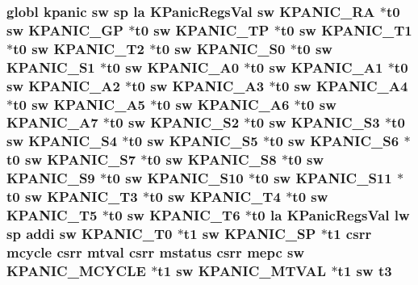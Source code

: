 \hypertarget{riscv_2kpanica_8S_aee57a95d2247b47bdd0ef4c3c0badccb}{
\subsubsection[{t3}]{\setlength{\rightskip}{0pt plus 5cm}globl {\bf kpanic} {\bf sw} {\bf sp} {\bf la} {\bf K\-Panic\-Regs\-Val} {\bf sw} {\bf K\-P\-A\-N\-I\-C\-\_\-\-R\-A} $\ast${\bf t0} {\bf sw} {\bf K\-P\-A\-N\-I\-C\-\_\-\-G\-P} $\ast${\bf t0} {\bf sw} {\bf K\-P\-A\-N\-I\-C\-\_\-\-T\-P} $\ast${\bf t0} {\bf sw} {\bf K\-P\-A\-N\-I\-C\-\_\-\-T1} $\ast${\bf t0} {\bf sw} {\bf K\-P\-A\-N\-I\-C\-\_\-\-T2} $\ast${\bf t0} {\bf sw} {\bf K\-P\-A\-N\-I\-C\-\_\-\-S0} $\ast${\bf t0} {\bf sw} {\bf K\-P\-A\-N\-I\-C\-\_\-\-S1} $\ast${\bf t0} {\bf sw} {\bf K\-P\-A\-N\-I\-C\-\_\-\-A0} $\ast${\bf t0} {\bf sw} {\bf K\-P\-A\-N\-I\-C\-\_\-\-A1} $\ast${\bf t0} {\bf sw} {\bf K\-P\-A\-N\-I\-C\-\_\-\-A2} $\ast${\bf t0} {\bf sw} {\bf K\-P\-A\-N\-I\-C\-\_\-\-A3} $\ast${\bf t0} {\bf sw} {\bf K\-P\-A\-N\-I\-C\-\_\-\-A4} $\ast${\bf t0} {\bf sw} {\bf K\-P\-A\-N\-I\-C\-\_\-\-A5} $\ast${\bf t0} {\bf sw} {\bf K\-P\-A\-N\-I\-C\-\_\-\-A6} $\ast${\bf t0} {\bf sw} {\bf K\-P\-A\-N\-I\-C\-\_\-\-A7} $\ast${\bf t0} {\bf sw} {\bf K\-P\-A\-N\-I\-C\-\_\-\-S2} $\ast${\bf t0} {\bf sw} {\bf K\-P\-A\-N\-I\-C\-\_\-\-S3} $\ast${\bf t0} {\bf sw} {\bf K\-P\-A\-N\-I\-C\-\_\-\-S4} $\ast${\bf t0} {\bf sw} {\bf K\-P\-A\-N\-I\-C\-\_\-\-S5} $\ast${\bf t0} {\bf sw} {\bf K\-P\-A\-N\-I\-C\-\_\-\-S6} $\ast${\bf t0} {\bf sw} {\bf K\-P\-A\-N\-I\-C\-\_\-\-S7} $\ast${\bf t0} {\bf sw} {\bf K\-P\-A\-N\-I\-C\-\_\-\-S8} $\ast${\bf t0} {\bf sw} {\bf K\-P\-A\-N\-I\-C\-\_\-\-S9} $\ast${\bf t0} {\bf sw} {\bf K\-P\-A\-N\-I\-C\-\_\-\-S10} $\ast${\bf t0} {\bf sw} {\bf K\-P\-A\-N\-I\-C\-\_\-\-S11} $\ast${\bf t0} {\bf sw} {\bf K\-P\-A\-N\-I\-C\-\_\-\-T3} $\ast${\bf t0} {\bf sw} {\bf K\-P\-A\-N\-I\-C\-\_\-\-T4} $\ast${\bf t0} {\bf sw} {\bf K\-P\-A\-N\-I\-C\-\_\-\-T5} $\ast${\bf t0} {\bf sw} {\bf K\-P\-A\-N\-I\-C\-\_\-\-T6} $\ast${\bf t0} {\bf la} {\bf K\-Panic\-Regs\-Val} {\bf lw} {\bf sp} addi {\bf sw} {\bf K\-P\-A\-N\-I\-C\-\_\-\-T0} $\ast${\bf t1} {\bf sw} {\bf K\-P\-A\-N\-I\-C\-\_\-\-S\-P} $\ast${\bf t1} csrr mcycle csrr mtval csrr {\bf mstatus} csrr {\bf mepc} {\bf sw} {\bf K\-P\-A\-N\-I\-C\-\_\-\-M\-C\-Y\-C\-L\-E} $\ast${\bf t1} {\bf sw} {\bf K\-P\-A\-N\-I\-C\-\_\-\-M\-T\-V\-A\-L} $\ast${\bf t1} {\bf sw} t3}}\label{riscv_2kpanica_8S_aee57a95d2247b47bdd0ef4c3c0badccb}
